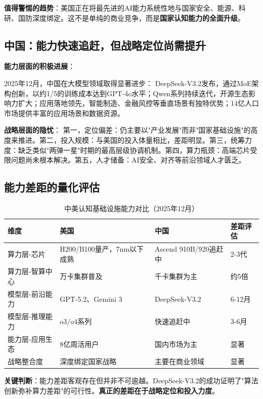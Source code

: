 \textbf{值得警惕的趋势}：美国正在将最先进的AI能力系统性地与国家安全、能源、科研、国防深度绑定。这不是单纯的商业竞争，而是\textbf{国家认知能力的全面升级}。

\subsection{中国：能力快速追赶，但战略定位尚需提升}

\textbf{能力层面的积极进展}：

2025年12月，中国在大模型领域取得显著进步：
DeepSeek-V3.2发布，通过MoE架构创新，以约1/5的训练成本达到GPT-4o水平；Qwen系列持续迭代，开源生态影响力扩大；应用落地领先，智能制造、金融风控等垂直场景有独特优势；14亿人口市场提供丰富的应用场景和数据资源。

\textbf{战略层面的隐忧}：
第一，定位偏差：仍主要以"产业发展"而非"国家基础设施"的高度来推进。第二，投入规模：与美国的投入体量相比，差距明显。第三，统筹力度：缺乏类似"两弹一星"时期的最高层级协调机制。第四，算力瓶颈：高端芯片受限问题尚未根本解决。第五，人才储备：AI安全、对齐等前沿领域人才匮乏。

\subsection{能力差距的量化评估}

\begin{table}[H]
\centering
\caption{中美认知基础设施能力对比（2025年12月）}
\small
\begin{tabular}{p{2.8cm}p{3.8cm}p{3.8cm}p{2cm}}
\toprule
\textbf{维度} & \textbf{美国} & \textbf{中国} & \textbf{差距评估} \\
\midrule
算力层-芯片 & H200/B100量产，7nm以下成熟 & Ascend 910B/920追赶中 & 2-3代 \\
算力层-智算中心 & 万卡集群普及 & 千卡集群为主 & 约5倍 \\
模型层-前沿能力 & GPT-5.2、Gemini 3 & DeepSeek-V3.2 & 6-12月 \\
模型层-推理能力 & o3/o4系列 & 快速追赶中 & 3-6月 \\
能力层-应用生态 & 8亿周活用户 & 国内市场为主 & 显著 \\
战略整合度 & 深度绑定国家战略 & 主要在商业领域 & 显著 \\
\bottomrule
\end{tabular}
\end{table}

\textbf{关键判断}：能力差距客观存在但并非不可逾越。DeepSeek-V3.2的成功证明了"算法创新弥补算力差距"的可行性。\textbf{真正的差距在于战略定位和投入力度}。

